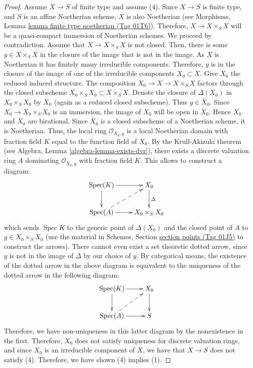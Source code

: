\documentclass{amsart}
\theoremstyle{plain}
\theoremstyle{definition}
\theoremstyle{remark}
\numberwithin{equation}{subsection}
\def\Spec{\mathop{\mathrm{Spec}}}
\begin{document}
\begin{proof}
\medskip\noindent
Assume $X \to S$ of finite type and assume (4).
Since $X \to S$ is finite type, and $S$ is an affine Noetherian
scheme, $X$ is also Noetherian (see
Morphisms, Lemma \href{https://stacks.math.columbia.edu/tag/01T6}{lemma finite type noetherian (Tag 01T6)}).
Therefore, $X \to X \times_S X$ will
be a quasi-compact immersion of Noetherian schemes.  We proceed by
contradiction.  Assume that $X \to X \times_S X$ is not closed.  Then,
there is some $y \in X \times_S X$ in the closure of the image that is
not in the image. As $X$ is Noetherian it has finitely many irreducible
components. Therefore, $y$ is in the closure of the image of one of
the irreducible components $X_0 \subset X$.  Give $X_0$ the reduced
induced structure.  The composition $X_0 \to X \to X \times_S X$
factors through the closed subscheme $X_0 \times_S X_0 \subset X \times_S X$.
Denote the closure of $\Delta(X_0)$ in $X_0 \times_S X_0$
by $\bar X_0$ (again as a reduced closed subscheme). Thus $y \in \bar X_0$.
Since $X_0 \to X_0 \times_S X_0$ is an immersion, the image of $X_0$
will be open in $\bar X_0$. Hence $X_0$ and $\bar X_0$ are
birational. Since $\bar{X}_0$ is a closed subscheme of a
Noetherian scheme, it is Noetherian. Thus, the local ring
$\mathcal O_{{\bar X_0, y}}$ is a local Noetherian domain with fraction
field $K$ equal to the function field of $X_0$.  By the Krull-Akizuki
theorem (see Algebra, Lemma \ref{algebra-lemma-exists-dvr}), there exists a
discrete valuation ring $A$ dominating $\mathcal O_{{\bar X_0, y}}$
with fraction field $K$.  This allows to construct a diagram:
\begin{equation}
\label{equation-valuative-generic}
\xymatrix{
\Spec(K) \ar[r] \ar[d] & X_0 \ar[d]^{\Delta} \\
\Spec(A) \ar[r] \ar@{-->}[ur]& X_0 \times_S X_0 \\
}
\end{equation}
which sends $\Spec K$ to the generic point of $\Delta(X_0)$ and
the closed point of $A$ to $y \in X_0 \times_S X_0$ (use the material in
Schemes, Section \href{https://stacks.math.columbia.edu/tag/01J5}{section points (Tag 01J5)} to construct the arrows).
There cannot even exist
a set theoretic dotted arrow, since $y$ is not in the image of
$\Delta$ by our choice of $y$.  By categorical means, the existence of
the dotted arrow in the above diagram is equivalent to the uniqueness
of the dotted arrow in the following diagram:
\begin{equation}
\label{equation-valuative-nonexistent}
\xymatrix{
\Spec(K) \ar[r] \ar[d] & X_0 \ar[d]\\
\Spec(A) \ar[r] \ar@{-->}[ur] & S \\
}
\end{equation}
Therefore, we have non-uniqueness in this latter diagram by the
nonexistence in the first.  Therefore, $X_0$ does not satisfy
uniqueness for discrete valuation rings, and since $X_0$ is an
irreducible component of $X$, we have that $X \to S$ does not satisfy
(4).  Therefore, we have shown (4) implies (1).
\end{proof}
\end{document}
